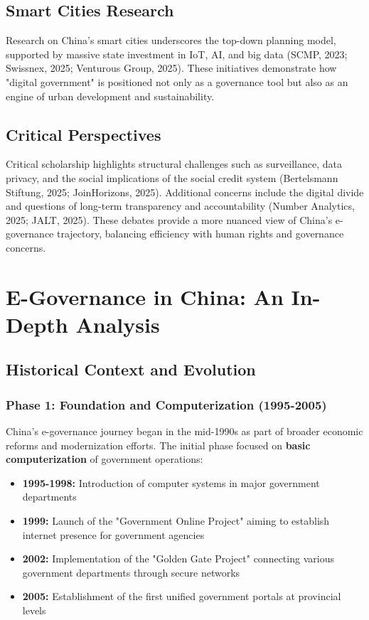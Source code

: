 \documentclass[12pt,a4paper]{article}
\begin{document}
\subsection{Smart Cities Research}

Research on China's smart cities underscores the top-down planning model, supported by massive state investment in IoT, AI, and big data (SCMP, 2023; Swissnex, 2025; Venturous Group, 2025). These initiatives demonstrate how "digital government" is positioned not only as a governance tool but also as an engine of urban development and sustainability.

\subsection{Critical Perspectives}

Critical scholarship highlights structural challenges such as surveillance, data privacy, and the social implications of the social credit system (Bertelsmann Stiftung, 2025; JoinHorizons, 2025). Additional concerns include the digital divide and questions of long-term transparency and accountability (Number Analytics, 2025; JALT, 2025). These debates provide a more nuanced view of China's e-governance trajectory, balancing efficiency with human rights and governance concerns.

\section{E-Governance in China: An In-Depth Analysis}

\subsection{Historical Context and Evolution}

\subsubsection{Phase 1: Foundation and Computerization (1995-2005)}

China's e-governance journey began in the mid-1990s as part of broader economic reforms and modernization efforts. The initial phase focused on \textbf{basic computerization} of government operations:

\begin{itemize}
    \item \textbf{1995-1998:} Introduction of computer systems in major government departments
    \item \textbf{1999:} Launch of the "Government Online Project" aiming to establish internet presence for government agencies
    \item \textbf{2002:} Implementation of the "Golden Gate Project" connecting various government departments through secure networks
    \item \textbf{2005:} Establishment of the first unified government portals at provincial levels
\end{itemize}
\end{document}
